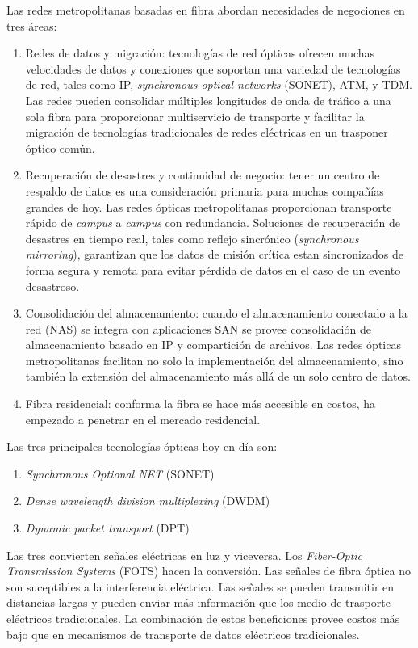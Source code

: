 \documentclass[10pt,journal,compsoc]{IEEEtran}
\begin{document}
Las redes metropolitanas basadas en fibra abordan necesidades de negociones en tres áreas:
\begin{enumerate}
    \item Redes de datos y migración: tecnologías de red ópticas ofrecen muchas velocidades de datos y conexiones que soportan una variedad de tecnologías de red, tales como IP, \emph{synchronous optical networks} (SONET), ATM, y TDM. Las redes pueden consolidar múltiples longitudes de onda de tráfico a una sola fibra para proporcionar multiservicio de transporte y facilitar la migración de tecnologías tradicionales de redes eléctricas en un trasponer óptico común.
    \item Recuperación de desastres y continuidad de negocio: tener un centro de respaldo de datos es una consideración primaria para muchas compañías grandes de hoy. Las redes ópticas metropolitanas proporcionan transporte rápido de \emph{campus} a \emph{campus} con redundancia. Soluciones de recuperación de desastres en tiempo real, tales como reflejo sincrónico (\emph{synchronous mirroring}), garantizan que los datos de misión crítica estan sincronizados de forma segura y remota para evitar pérdida de datos en el caso de un evento desastroso.
    \item Consolidación del almacenamiento: cuando el almacenamiento conectado a la red (NAS) se integra con aplicaciones SAN se provee consolidación de almacenamiento basado en IP y compartición de archivos. Las redes ópticas metropolitanas facilitan no solo la implementación del almacenamiento, sino también la extensión del almacenamiento más allá de un solo centro de datos. 
   \item Fibra residencial: conforma la fibra se hace más accesible en costos, ha empezado a penetrar en el mercado residencial.
\end{enumerate}


Las tres principales tecnologías ópticas hoy en día son:
\begin{enumerate}
    \item \emph{Synchronous Optional NET} (SONET)
    \item \emph{Dense wavelength division multiplexing} (DWDM)
    \item \emph{Dynamic packet transport} (DPT)
\end{enumerate}

Las tres convierten señales eléctricas en luz y viceversa. Los \emph{Fiber-Optic Transmission Systems} (FOTS) hacen la conversión. Las señales de fibra óptica no son suceptibles a la interferencia eléctrica. Las señales se pueden transmitir en distancias largas y pueden enviar más información que los medio de trasporte eléctricos tradicionales. La combinación de estos beneficiones provee costos más bajo que en mecanismos de transporte de datos eléctricos tradicionales.
\end{document}
